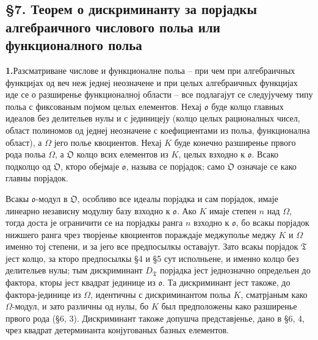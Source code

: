 \documentclass[11pt]{article}
\newcommand{\mo}{\mathfrak{o}}
\newcommand{\mO}{\mathfrak{O}}
\newcommand{\mT}{\mathfrak{T}}
\begin{document}
\setcounter{footnote}{28}

\subsection*{§7. Теорем о дискриминанту за порјадкы алгебраичного числового польа или функционалного польа}

\noindent\textbf{1.}\quad Разсматриване числове и функционалне польа -- при чем при алгебраичных функцијах од веч неж једнеј неозначене и при целых алгебраичных функцијах иде се о разширенье функционалној области -- все подлагајут се следујучему типу польа с фиксованым појмом целых елементов. Нехај $\mo$ буде колцо главных идеалов без делительев нулы и с јединицеју (колцо целых рационалных чисел, област полиномов од једнеј неозначене с коефициентами из польа, функционална област), а $\Omega$ јего полье квоциентов. Нехај $K$ буде конечно разширенье првого рода польа $\Omega$, а $\mO$ колцо всих елементов из $K$, целых взходно к $\mo$. Всако подколцо од $\mO$, кторо обејмаје $\mo$, называ се порјадок; само $\mO$ означаје се како главны порјадок.

Всакы $\mo$-модул в $\mO$, особливо все идеалы порјадка и сам порјадок, имаје линеарно независну модулну базу взходно к $\mo$. Ако $K$ имаје степен $n$ над $\Omega$, тогда доста је ограничити се на порјадкы ранга $n$ взходно к $\mo$, бо всакы порјадок нижшего ранга чрез творјенье квоциентов пораждаје меджуполье меджу $K$ и $\Omega$ именно тој степени, и за јего все предпосылкы оставајут. Зато всакы порјадок $\mT$ јест колцо, за кторо предпосылкы §4 и §5 сут исполньене, и именно колцо без делительев нулы; тым дискриминант $D_\mT$ порјадка јест једнозначно определьен до фактора, кторы јест квадрат јединице из $\mo$. Та дискриминант јест такоже, до фактора-јединице из $\Omega$, идентичны с дискриминантом польа $K$, сматрјаным како $\Omega$-модул, и зато различны од нулы, бо $K$ был предположены како разширенье првого рода (§6, 3). Дискриминант такоже допушча представјенье, дано в §6, 4, чрез квадрат детерминанта конјугованых базных елементов.
\end{document}
